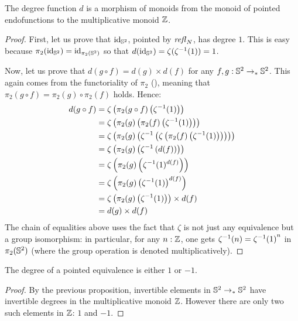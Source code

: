 \documentclass[english,a4]{article}
\newcommand{\ptdto}{\to_\ast}%
\begin{document}
\begin{proposition}
  The degree function $d$ is a morphism of monoids from the monoid of pointed
  endofunctions to the multiplicative monoid $\mathbb{Z}$.
  \label{prop:deg-monoid-morphism}
\end{proposition}
\begin{proof}
  First, let us prove that $\mathord{\mathrm{id}}_{{\mathbb S^{2}}}$, pointed by $\mathop{{\mathit{refl}}_{N}}$, has degree $1$.
  This is easy because $\pi_2(\mathord{\mathrm{id}}_{{\mathbb S^{2}}}) = \mathord{\mathrm{id}}_{\pi_2({{\mathbb S^{2}}})}$ so that $d(\mathord{\mathrm{id}}_{{\mathbb S^{2}}})
  = \zeta({\zeta}^{-1}(1)) = 1$.

  Now, let us prove that $d(g\circ f) = d(g)\times d(f)$ for any $f,g:\Sp
  \ptdto\Sp$. This again comes from the functoriality of $\pi_2$
  (\cite[after Lem.\ 7.3.3 and before Def.\ 8.4.2]{HoTT}), 
  meaning that $\pi_2(g\circ f) = \pi_2(g)\circ\pi_2(f)$
  holds. Hence:
  \begin{align*}
    d(g\circ f) &= \zeta\left( \pi_2(g\circ f)\left( {\zeta}^{-1}(1) \right) \right) 
    \\
    &= \zeta\left( \pi_2(g) \left( \pi_2(f)\left( {\zeta}^{-1}(1) \right)
    \right) \right) 
    \\
    &= \zeta\left( \pi_2(g) \left( {\zeta}^{-1} \left( \zeta \left( \pi_2(f)\left( {\zeta}^{-1}(1) \right)
    \right) \right) \right) \right)
    \\
    &= \zeta \left( \pi_2(g) \left( {\zeta}^{-1} \left(d(f)\right) \right) \right)
    \\
    &= \zeta \left( \pi_2(g) \left( {\zeta}^{-1}(1)^{d(f)} \right) \right)
    \\
    &= \zeta \left( \pi_2(g) \left( {\zeta}^{-1}(1)\right)^{d(f)} \right)
    \\
    &= \zeta \left( \pi_2(g) \left( {\zeta}^{-1}(1)\right) \right)\times d(f)
    \\
    &= d(g)\times d(f)
  \end{align*}
  The chain of equalities above uses the fact that $\zeta$ is not just any
  equivalence but a group isomorphism: in particular, for any $n:\mathbb{Z}$, one
  gets ${\zeta}^{-1}(n) = {{\zeta}^{-1}(1)}^n$ in $\pi_2({{\mathbb S^{2}}})$ (where the group
  operation is denoted multiplicatively).
\end{proof}

\begin{corollary}
  The degree of a pointed equivalence is either $1$ or $-1$.
  \label{cor:degree-equivalences}
\end{corollary}
\begin{proof}
  By the previous proposition, invertible elements in $\Sp \ptdto \Sp$ have
  invertible degrees in the multiplicative monoid $\mathbb{Z}$. However there are only
  two such elements in $\mathbb{Z}$: $1$ and $-1$. 
\end{proof}
\end{document}
